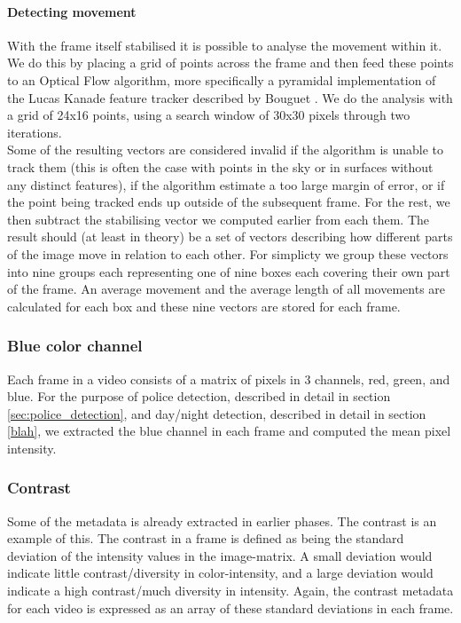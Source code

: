 \paragraph{Detecting movement}
%
With the frame itself stabilised it is possible to analyse the movement within it. We do this by placing a grid of points across the frame and then feed these points to an Optical Flow algorithm, more specifically a pyramidal implementation of the Lucas Kanade feature tracker described by Bouguet \cite{Bouguet2000}. We do the analysis with a grid of 24x16 points, using a search window of 30x30 pixels through two iterations.\\%
Some of the resulting vectors are considered invalid if the algorithm is unable to track them (this is often the case with points in the sky or in surfaces without any distinct features), if the algorithm estimate a too large margin of error, or if the point being tracked ends up outside of the subsequent frame. For the rest, we then subtract the stabilising vector we computed earlier from each them. The result should (at least in theory) be a set of vectors describing how different parts of the image move in relation to each other. For simplicty we group these vectors into nine groups each representing one of nine boxes each covering their own part of the frame.
%
%
An average movement and the average length of all movements are calculated for each box and these nine vectors are stored for each frame.
%
%
\subsubsection{Blue color channel}\label{sec:blue_channel}
%
Each frame in a video consists of a matrix of pixels in 3 channels, red, green, and blue. For the purpose of police detection, described in detail in section \ref{sec:police_detection}, and day/night detection, described in detail in section \ref{blah}, we extracted the blue channel in each frame and computed the mean pixel intensity.
%
\subsubsection{Contrast}
%
Some of the metadata is already extracted in earlier phases. The contrast is an example of this. The contrast in a frame is defined as being the standard deviation of the intensity values in the image-matrix. A small deviation would indicate little contrast/diversity in color-intensity, and a large deviation would indicate a high contrast/much diversity in intensity. Again, the contrast metadata for each video is expressed as an array of these standard deviations in each frame.
%

